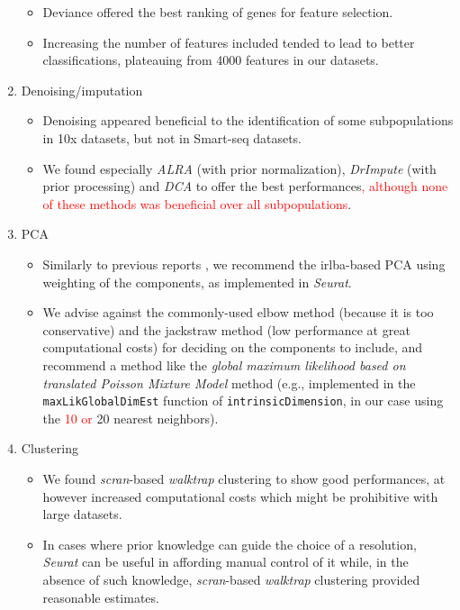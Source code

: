 \documentclass{bmcart}
\begin{document}
\begin{enumerate}
   \begin{itemize}
     \item Deviance \cite{townesGlmpca2019} offered the best ranking of genes for feature selection.
     \item Increasing the number of features included tended to lead to better classifications, plateauing from 4000 features in our datasets.
   \end{itemize}
   \item Denoising/imputation
   \begin{itemize}
       \item Denoising appeared beneficial to the identification of some subpopulations in 10x datasets, but not in Smart-seq datasets.
       \item We found especially \textit{ALRA} (with prior normalization), \textit{DrImpute} (with prior processing) and \textit{DCA} to offer the best performances\textcolor{red}{, although none of these methods was beneficial over all subpopulations}.
   \end{itemize}
   \item PCA
   \begin{itemize}
     \item Similarly to previous reports \cite{SunDimRed2019}, we recommend the irlba-based PCA using weighting of the components, as implemented in \textit{Seurat}. 
     \item We advise against the commonly-used elbow method (because it is too conservative) and the jackstraw method (low performance at great computational costs) for deciding on the components to include, and recommend a method like the \textit{global maximum likelihood based on translated Poisson Mixture Model} method (e.g., implemented in the  \texttt{maxLikGlobalDimEst} function of \texttt{intrinsicDimension}, in our case using the \textcolor{red}{10 or }20 nearest neighbors).
   \end{itemize}
   \item Clustering
   \begin{itemize}
    \item We found \textit{scran}-based \textit{walktrap} clustering to show good performances, at however increased computational costs which might be prohibitive with large datasets.
    \item In cases where prior knowledge can guide the choice of a resolution, \textit{Seurat} can be useful in affording manual control of it while, in the absence of such knowledge, \textit{scran}-based \textit{walktrap} clustering provided reasonable estimates.
   \end{itemize}
\end{enumerate}
\end{document}
